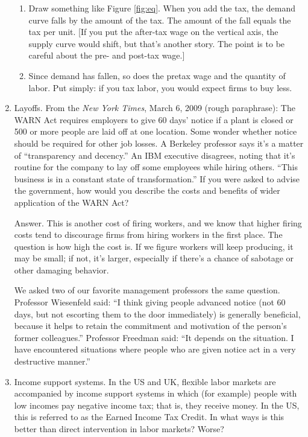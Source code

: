 \begin{enumerate}
\begin{enumerate}
\item Draw something like Figure \ref{fig:eq}.
When you add the tax, the demand curve falls by the amount of the tax.
The amount of the fall equals the tax per unit.
[If you put the after-tax wage on the vertical axis,
the supply curve would shift, but that's another story.
The point is to be careful about the pre- and post-tax wage.]
\item Since demand has fallen, so does the pretax wage
and the quantity of labor.
Put simply:  if you tax labor, you would expect firms to buy
less.
\end{enumerate}


\item Layoffs.
From the \emph{New York Times}, March 6, 2009 (rough paraphrase):
The WARN Act requires employers to give 60 days' notice
if a plant is closed or 500 or more people are laid off at one location.
Some wonder whether notice should be required for other job losses.
A Berkeley professor says
it's a matter of ``transparency and decency.''
An IBM executive disagrees, noting that it's routine for the company to lay off some employees while hiring others.
``This business is in a constant state of transformation.''
If you were asked to advise the government,
how would you describe the costs and benefits of
wider application of the WARN Act?

Answer.
This is another cost of firing workers,
and we know that higher firing costs tend to discourage firms
from hiring workers in the first place.
The question is how high the cost is.
If we figure workers will keep producing, it may be small;
if not, it's larger, especially if there's a chance of sabotage or other
damaging behavior.

We asked two of our favorite management professors
the same question.
Professor Wiesenfeld said:
``I think giving people advanced notice (not 60 days, but not escorting them to the door immediately) is generally beneficial,
because it helps to retain the commitment and motivation of the person's former colleagues.''
Professor Freedman said:
``It depends on the situation.
I have encountered situations where people who are given
notice act in a very destructive manner.''


\item Income support systems.
In the US and UK, flexible labor markets are accompanied by
income support systems in which (for example) people with low
incomes pay negative income tax; that is, they receive money.
In the US, this is referred to as the Earned Income Tax Credit.
In what ways is this better than direct intervention in labor markets?  Worse?


\end{enumerate}
